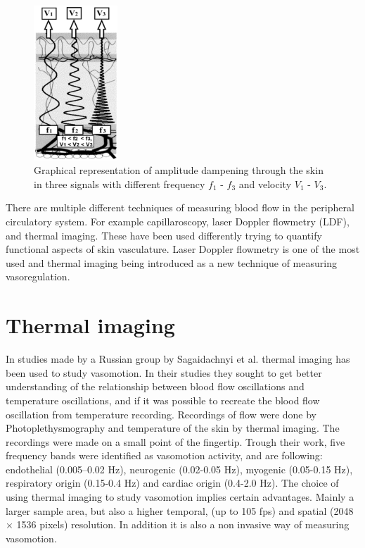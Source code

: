\begin{figure}[H]
	\centering	\includegraphics[width=0.28\textwidth]{figures/attenuation}
	\caption{Graphical representation of amplitude dampening through the skin in three signals with different frequency $f_{1}$ - $f_{3}$ and velocity $V_{1}$ - $V_{3}$.\cite{sagaidachnyi2014}}
	\label{fig:atten}
\end{figure} \vspace{-.3cm}

There are multiple different techniques of measuring blood flow in the peripheral circulatory system. For example capillaroscopy, laser Doppler flowmetry (LDF), and thermal imaging. These have been used differently trying to quantify functional aspects of skin vasculature.\cite{liu2012} Laser Doppler flowmetry is one of the most used\cite{geyer2004} and thermal imaging being introduced as a new technique of measuring vasoregulation\cite{sagaidachnyi2014}.

\section{Thermal imaging}
\label{sec:thermalImaging}
In studies made by a Russian group by Sagaidachnyi et al. thermal imaging has been used to study vasomotion. In their studies they sought to get better understanding of the relationship between blood flow oscillations and temperature oscillations, and if it was possible to recreate the blood flow oscillation from temperature recording. Recordings of flow were done by Photoplethysmography and temperature of the skin by thermal imaging. The recordings were made on a small point of the fingertip. Trough their work, five frequency bands were identified as vasomotion activity, and are following: endothelial (0.005–0.02 Hz), neurogenic (0.02-0.05 Hz), myogenic (0.05-0.15 Hz), respiratory origin (0.15-0.4 Hz) and cardiac origin (0.4-2.0 Hz).\cite{sagaidachnyi2017,sagaidachnyi2014}
The choice of using thermal imaging to study vasomotion implies certain advantages. Mainly a larger sample area, but also a higher temporal, (up to 105 fps) and spatial (2048 × 1536 pixels) resolution. In addition it is also a non invasive way of measuring vasomotion.\cite{sagaidachnyi2017}

